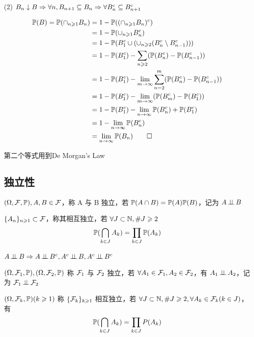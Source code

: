 (2) $B_n\downarrow B\Rightarrow \forall n, B_{n+1}\subseteq B_n \Rightarrow \forall B_n^c\subseteq B_{n+1}^c$

\[
\begin{aligned}
    \mathbb{P}(B) = \mathbb{P}(\cap_{n\geqslant 1}B_n) &= 1-\mathbb{P}((\cap_{n\geqslant 1}B_n)^c)\\
    &=1-\mathbb{P}(\cup_{n\geqslant 1}B_n^c)\\
    &=1-\mathbb{P}(B_1^c\cup (\cup_{n\geqslant 2}(B_n^c\setminus B_{n-1}^c)))\\
    &=1-\mathbb{P}(B_1^c)-\sum_{n\geqslant 2}(\mathbb{P}(B_n^c)-\mathbb{P}(B_{n-1}^c))\\
    &=1-\mathbb{P}(B_1^c)-\lim_{m \to \infty}\sum_{n=2}^m(\mathbb{P}(B_n^c)-\mathbb{P}(B_{n-1}^c))\\
    &=1-\mathbb{P}(B_1^c)-\lim_{m \to \infty}(\mathbb{P}(B_m^c)-\mathbb{P}(B_1^c))\\
    &=1-\mathbb{P}(B_1^c)-\lim_{n \to \infty}\mathbb{P}(B_n^c)+\mathbb{P}(B_1^c)\\
    &=1-\lim_{n \to \infty}\mathbb{P}(B_n^c)\\
    &=\lim_{n \to \infty}\mathbb{P}(B_n)\qed
\end{aligned}
\]

第二个等式用到De Morgan's Law

\newpage
\subsection{独立性}

\begin{definition}[事件间的独立性]
    $(\Omega,\mathcal{F}, \mathbb{P}), A,B\in \mathcal{F}$，称 A 与 B 独立，若 $\mathbb{P}(A\cap B)=\mathbb{P}(A)\mathbb{P}(B)$，记为 $A\operatorname{\perp\!\!\!\perp} B$
\end{definition}

\begin{definition}[事件间的相互独立]
    $\{{A}_{n}\}_{n \geqslant 1} \subset \mathcal{F}$，称其相互独立，若 $\forall J\subset \mathbb{N}, \#J\geqslant 2$
    \[
    \mathbb{P}(\bigcap_{k\in J}A_k)=\prod_{k\in J}\mathbb{P}(A_k)
    \]
\end{definition}

\begin{property}\label{prop:counter_indep}
    $A\ind B\Rightarrow A\ind B^c, A^c \ind B, A^c\ind B^c$
\end{property}

\begin{definition}\label{def:sigma_indep}
    $(\Omega, \mathcal{F}_1, \mathbb{P}), (\Omega, \mathcal{F}_2, \mathbb{P})$ 称 $\mathcal{F}_1$ 与 $\mathcal{F}_2$ 独立，若 $\forall A_1\in \mathcal{F}_1, A_2\in \mathcal{F}_2$，有 $A_1\operatorname{\perp\!\!\!\perp} A_2$，记为 $\mathcal{F}_1\operatorname{\perp\!\!\!\perp} \mathcal{F}_2$
\end{definition}

\begin{definition}
    $(\Omega, \mathcal{F}_k, \mathbb{P})(k\geqslant 1)$ 称 $\{{\mathcal{F}}_{k}\}_{k \geqslant 1}$ 相互独立，若 $\forall J\subset \mathbb{N}, \#J\geqslant 2, \forall A_k\in \mathcal{F}_k(k\in J)$，有
    \[
    \mathbb{P}(\bigcap_{k\in J}A_k)=\prod_{k\in J}P(A_k)
    \]
\end{definition}

